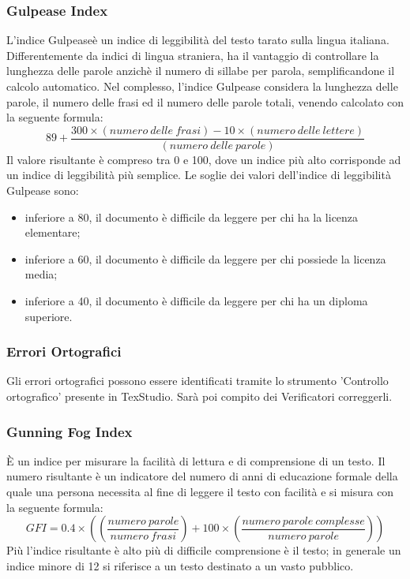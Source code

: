 		\subsubsection{Gulpease Index} 
		\label{B.2.1}
		L’indice Gulpease\pedice è un indice di leggibilità del testo tarato sulla
		lingua italiana. Differentemente da indici di lingua straniera, ha il vantaggio di controllare
la lunghezza delle parole anzichè il numero di sillabe per parola, semplificandone il calcolo
automatico.
		Nel complesso, l’indice Gulpease considera la lunghezza delle parole, il numero delle frasi
ed il numero delle parole totali, venendo calcolato con la seguente formula:\newline
		\[
		 	89+\frac{300 \times (numero ~delle ~frasi) - 10 \times (numero ~delle ~lettere)}{(numero ~delle ~parole)}
		\]\newline	
		Il valore risultante è compreso tra 0 e 100, dove un indice più alto corrisponde ad un
indice di leggibilità più semplice.
		Le soglie dei valori dell’indice di leggibilità Gulpease sono:
		\begin{itemize}
			\item inferiore a 80, il documento è difficile da leggere per chi ha la licenza elementare;
			\item  inferiore a 60, il documento è difficile da leggere per chi possiede la licenza media;
			\item inferiore a 40, il documento è difficile da leggere per chi ha un diploma superiore.
			\newline
		\end{itemize}
		\subsubsection{Errori Ortografici} Gli errori ortografici possono essere identificati tramite lo strumento 'Controllo
ortografico' presente in TexStudio. Sarà poi compito dei Verificatori correggerli.
\newline
		\subsubsection{Gunning Fog Index} È un indice per misurare la facilità di lettura e di comprensione di un testo. Il numero risultante è un indicatore del numero di anni di educazione formale della quale una persona necessita al fine di leggere il testo con facilità e si misura con la seguente formula:\newline
		\[
		GFI=0.4\times((\frac{numero ~parole}{numero ~frasi})+100\times(\frac{numero ~parole ~complesse}{numero ~parole}))
		\]\newline
		Più l'indice risultante è alto più di difficile comprensione è il testo; in generale un indice minore di 12 si riferisce a un testo destinato a un vasto pubblico.
